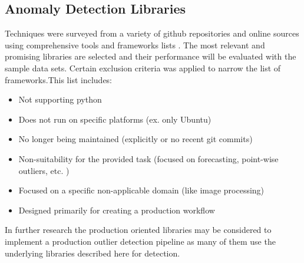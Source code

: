 




\subsection{Anomaly Detection Libraries}
\label{ref_code_libraries}
 Techniques were surveyed from a variety of github repositories and online sources using comprehensive tools and frameworks lists \cite{medico2020-ts-list}. The most relevant and promising libraries are selected and their performance will be evaluated with the sample data sets. Certain exclusion criteria was applied to narrow the list of frameworks.This list includes:
 \begin{itemize}[leftmargin=1cm]
     \item Not supporting python
     \item Does not run on specific platforms (ex. only Ubuntu)
     \item No longer being maintained (explicitly or no recent git commits)
     \item Non-suitability for the provided task (focused on forecasting, point-wise outliers, etc. )
     \item Focused on a specific non-applicable domain (like image processing)
     \item Designed primarily for creating a production workflow

 \end{itemize}
 In further research the production oriented libraries may be considered to implement a production outlier detection pipeline as many of them use the underlying libraries described here for detection. 
 
